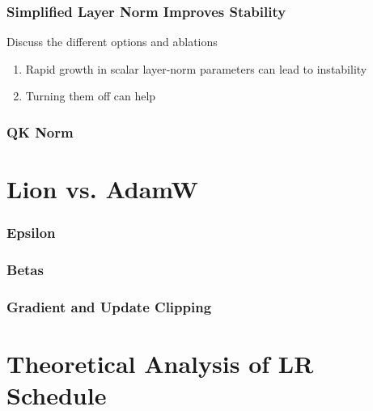\subsubsection{Simplified Layer Norm Improves Stability}

Discuss the different options and ablations

\begin{enumerate}
    \item Rapid growth in scalar layer-norm parameters can lead to instability
    \item Turning them off can help
\end{enumerate}

\subsubsection{QK Norm}



\section{Lion vs. AdamW}


\subsubsection{Epsilon}

\subsubsection{Betas}

\subsubsection{Gradient and Update Clipping}

\section{Theoretical Analysis of LR Schedule}

